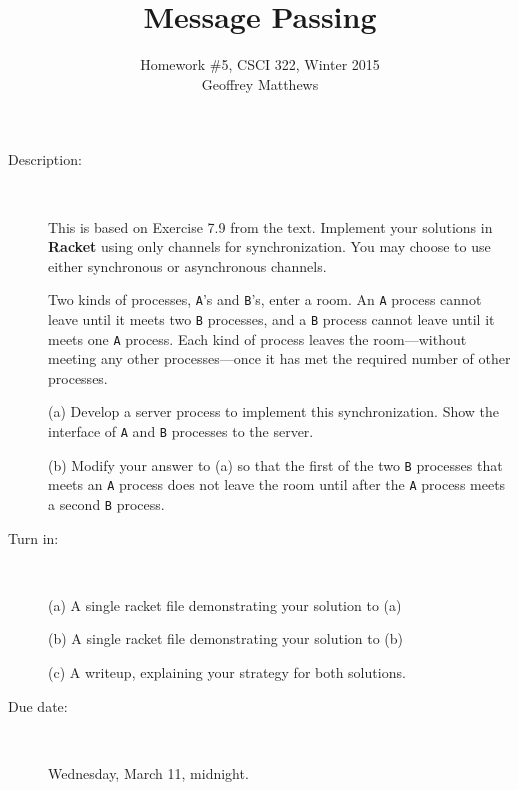 \documentclass{article}
\title{Message Passing}
\author{Homework \#5, CSCI 322, Winter 2015\\
Geoffrey Matthews}
\begin{document}
\maketitle
\begin{description}
\item[Description:] \ 

This is based on Exercise 7.9 from the text.  
Implement your solutions in {\bf Racket} using only channels for
synchronization.  You may choose to use either synchronous or
asynchronous channels.

Two kinds of processes, {\tt A}'s and {\tt B}'s, enter a room.  An
{\tt A} process cannot leave until it meets two {\tt B} processes, and
a {\tt B} process cannot leave until it meets one {\tt A} process.
Each kind of process leaves the room---without meeting any other
processes---once it has met the required number of other processes.

{(a)}  
Develop a server process to implement this synchronization.  Show the
interface of {\tt A} and {\tt B} processes to the server.

{(b)} 
Modify your answer to (a) so that the first of the two {\tt B}
processes that meets an {\tt A} process does not leave the room until
after the {\tt A} process meets a second {\tt B} process.

\item[Turn in:]\ 

(a) A single racket file demonstrating your solution to (a)

(b) A single racket file demonstrating your solution to (b)

(c) A writeup, explaining your strategy for both solutions.

\item[Due date:] \ 

Wednesday, March 11, midnight.


\end{description}
\end{document}
